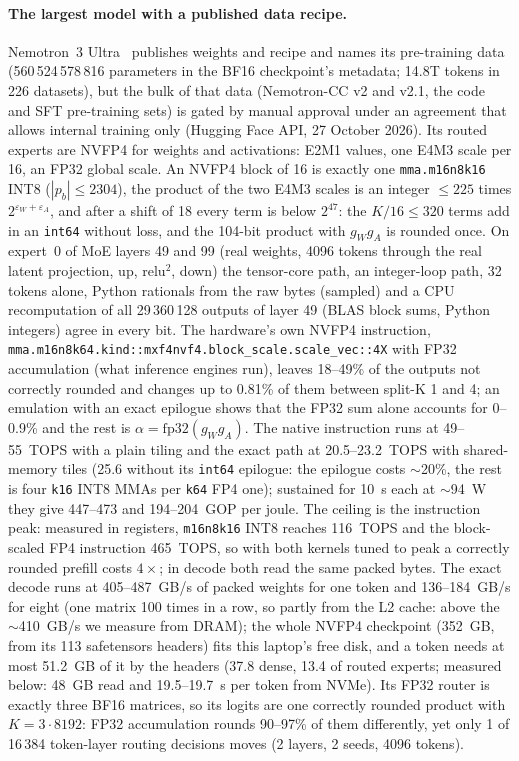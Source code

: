 \documentclass[11pt]{article}
\begin{document}
\paragraph{The largest model with a published data recipe.} Nemotron~3 Ultra~\cite{nemotron3} publishes weights and recipe
and names its pre-training data (560\,524\,578\,816 parameters in the BF16 checkpoint's metadata; 14.8T tokens in 226
datasets), but the bulk of that data (Nemotron-CC v2 and v2.1, the code and SFT pre-training sets) is gated by manual
approval under an agreement that allows internal training only (Hugging Face API, 27 October 2026). Its
routed experts are NVFP4 for weights and activations: E2M1 values, one E4M3 scale per 16, an FP32 global scale. An NVFP4
block of 16 is exactly one \texttt{mma.m16n8k16} INT8 ($|p_b|\le 2304$), the product of the two E4M3 scales is an integer
$\le 225$ times $2^{\varepsilon_W+\varepsilon_A}$, and after a shift of 18 every term is below $2^{47}$: the $K/16\le 320$
terms add in an \texttt{int64} without loss, and the 104-bit product with $g_Wg_A$ is rounded once. On expert~0 of MoE layers
49 and 99 (real weights, 4096 tokens through the real latent projection, up, relu$^2$, down) the tensor-core path, an
integer-loop path, 32 tokens alone, Python rationals from the raw bytes (sampled) and a CPU recomputation of all
29\,360\,128 outputs of layer 49 (BLAS block sums, Python integers) agree in every bit. The hardware's own NVFP4 instruction,
\texttt{mma.m16n8k64.kind::mxf4nvf4.block\_scale.scale\_vec::4X} with FP32 accumulation (what inference engines run), leaves
18--49\% of the outputs not correctly rounded and changes up to 0.81\% of them between split-K 1 and 4; an emulation with
an exact epilogue shows that the FP32 sum alone accounts for 0--0.9\% and the rest is $\alpha=\mathrm{fp32}(g_Wg_A)$. The
native instruction runs at 49--55~TOPS with a plain tiling and the exact path at 20.5--23.2~TOPS with shared-memory tiles
(25.6 without its \texttt{int64} epilogue: the epilogue costs $\sim$20\%, the rest is four \texttt{k16} INT8 MMAs per
\texttt{k64} FP4 one); sustained for 10~s each at $\sim$94~W they give 447--473 and 194--204~GOP per joule. The ceiling is the instruction peak: measured in
registers, \texttt{m16n8k16} INT8 reaches 116~TOPS and the block-scaled FP4 instruction 465~TOPS, so with both kernels tuned
to peak a correctly rounded prefill costs $4\times$; in decode both read the same packed bytes. The exact decode runs at
405--487~GB/s of packed weights for one token and 136--184~GB/s for eight (one matrix 100 times in a row, so partly from the
L2 cache: above the $\sim$410~GB/s we measure from DRAM); the whole NVFP4 checkpoint (352~GB, from its 113 safetensors headers) fits this laptop's free disk, and a token needs
at most 51.2~GB of it by the headers (37.8 dense, 13.4 of routed experts; measured below: 48~GB read and 19.5--19.7~s per token from NVMe). Its FP32 router is exactly three BF16
matrices, so its logits are one correctly rounded product with $K=3\cdot 8192$: FP32 accumulation rounds 90--97\% of them
differently, yet only 1 of 16\,384 token-layer routing decisions moves (2 layers, 2 seeds, 4096 tokens).
\end{document}

